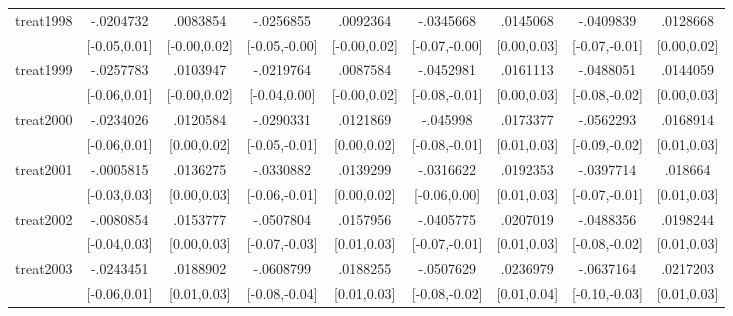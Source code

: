 \begin{table}[htbp]
\begin{tabular}{l*{8}{c}}
treat1998   &   -.0204732         &    .0083854         &   -.0256855\sym{*}  &    .0092364         &   -.0345668\sym{*}  &    .0145068\sym{*}  &   -.0409839\sym{*}  &    .0128668\sym{*}  \\
            &[-0.05,0.01]         &[-0.00,0.02]         &[-0.05,-0.00]         &[-0.00,0.02]         &[-0.07,-0.00]         & [0.00,0.03]         &[-0.07,-0.01]         & [0.00,0.02]         \\
treat1999   &   -.0257783         &    .0103947         &   -.0219764         &    .0087584         &   -.0452981\sym{**} &    .0161113\sym{**} &   -.0488051\sym{**} &    .0144059\sym{*}  \\
            &[-0.06,0.01]         &[-0.00,0.02]         &[-0.04,0.00]         &[-0.00,0.02]         &[-0.08,-0.01]         & [0.00,0.03]         &[-0.08,-0.02]         & [0.00,0.03]         \\
treat2000   &   -.0234026         &    .0120584\sym{*}  &   -.0290331\sym{*}  &    .0121869\sym{*}  &    -.045998\sym{**} &    .0173377\sym{**} &   -.0562293\sym{**} &    .0168914\sym{**} \\
            &[-0.06,0.01]         & [0.00,0.02]         &[-0.05,-0.01]         & [0.00,0.02]         &[-0.08,-0.01]         & [0.01,0.03]         &[-0.09,-0.02]         & [0.01,0.03]         \\
treat2001   &   -.0005815         &    .0136275\sym{*}  &   -.0330882\sym{**} &    .0139299\sym{**} &   -.0316622         &    .0192353\sym{**} &   -.0397714\sym{*}  &     .018664\sym{**} \\
            &[-0.03,0.03]         & [0.00,0.03]         &[-0.06,-0.01]         & [0.00,0.02]         &[-0.06,0.00]         & [0.01,0.03]         &[-0.07,-0.01]         & [0.01,0.03]         \\
treat2002   &   -.0080854         &    .0153777\sym{**} &   -.0507804\sym{***}&    .0157956\sym{**} &   -.0405775\sym{*}  &    .0207019\sym{***}&   -.0488356\sym{**} &    .0198244\sym{***}\\
            &[-0.04,0.03]         & [0.00,0.03]         &[-0.07,-0.03]         & [0.01,0.03]         &[-0.07,-0.01]         & [0.01,0.03]         &[-0.08,-0.02]         & [0.01,0.03]         \\
treat2003   &   -.0243451         &    .0188902\sym{**} &   -.0608799\sym{***}&    .0188255\sym{***}&   -.0507629\sym{**} &    .0236979\sym{***}&   -.0637164\sym{***}&    .0217203\sym{***}\\
            &[-0.06,0.01]         & [0.01,0.03]         &[-0.08,-0.04]         & [0.01,0.03]         &[-0.08,-0.02]         & [0.01,0.04]         &[-0.10,-0.03]         & [0.01,0.03]         \\

\end{tabular}
\end{table}
